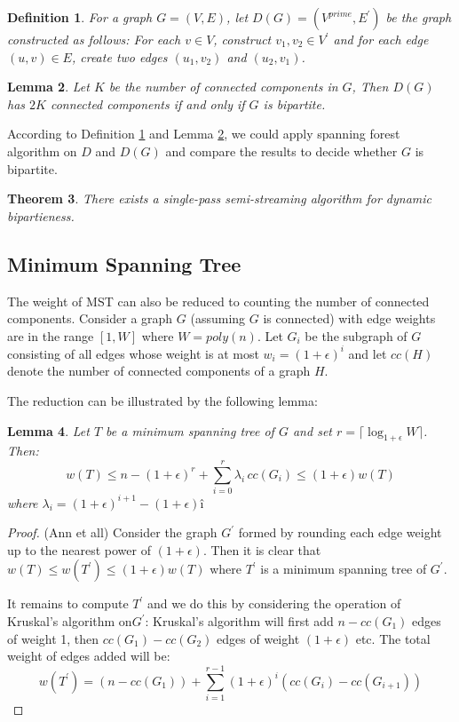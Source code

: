 \documentclass[11pt]{article}
\theoremstyle{plain}
\newtheorem{theorem}{Theorem}[section]
\newtheorem{definition}[theorem]{Definition}
\newtheorem{lemma}[theorem]{Lemma}
\begin{document}
\begin{definition}
\label{def:D-bipartite}
For a graph $G=(V,E)$, let $D(G)=(V^{prime}, E^{\prime})$ be the graph 
constructed as follows: For each $v\in V$, construct $v_1, v_2\in V^{\prime}$ and 
for each edge $(u,v)\in E$, create two edges $(u_1, v_2)$ and $(u_2,v_1)$.
\end{definition}

\begin{lemma}
	\label{le:D-bipartite}
Let $K$ be the number of connected components in $G$, Then $D(G)$ has $2K$ 
connected components if and only if $G$ is bipartite. 
\end{lemma}

According to Definition \ref{def:D-bipartite} and Lemma \ref{le:D-bipartite}, we 
could apply spanning forest algorithm on $D$ and $D(G)$ and compare the 
results to decide whether $G$ is bipartite. 

\begin{theorem}
There exists a single-pass semi-streaming algorithm for dynamic bipartieness.
\end{theorem}

\subsection{Minimum Spanning Tree}
The weight of MST can also be reduced to counting the number of connected 
components. Consider a graph $G$ (assuming $G$ is connected) with edge 
weights are in the range $[1,W]$ where $W=poly(n)$. Let $G_i$ be the subgraph 
of $G$ consisting of all edges whose weight is at most $w_i=(1+\epsilon)^i$ 
and let $cc(H)$ denote the number of connected components of a graph $H$. 

The reduction can be illustrated by the following lemma:

\begin{lemma}
	\label{le:mst}
	Let $T$ be a minimum spanning tree of $G$ and set $r=\lceil \log_{1+\epsilon} 
	W\rceil$. Then:
	\[
	w(T)\leq n-(1+\epsilon)^r +\sum_{i=0}^r \lambda_i\,cc(G_i)\leq(1+\epsilon)w(T)
	\]
	where $\lambda_i=(1+\epsilon)^{i+1}-(1+\epsilon)î$
\end{lemma}

\begin{proof}(Ann et all)
Consider the graph $G^{\prime}$
formed by rounding each edge weight up to the nearest power of 
$(1+\epsilon)$. Then it is clear that $w(T) \leq w(T^{\prime})\leq 
(1+\epsilon)w(T)$ where $T^{\prime}$ is a minimum spanning tree of 
$G^{\prime}$. 

It remains to compute $T^{\prime}$ and we do this by considering the 
operation of Kruskal’s algorithm on$G^{\prime}$: Kruskal’s algorithm will first 
add $n − cc(G_1)$ edges of weight 1, then $cc(G_1) − cc(G_2)$ edges of
weight $(1+\epsilon)$ etc. The total weight of edges added will be:
\[
w(T^{\prime})=(n-cc(G_1))+\sum_{i=1}^{r-1}(1+\epsilon)^i (cc(G_i)-cc(G_{i+1}))
\]
\end{proof}
\end{document}
